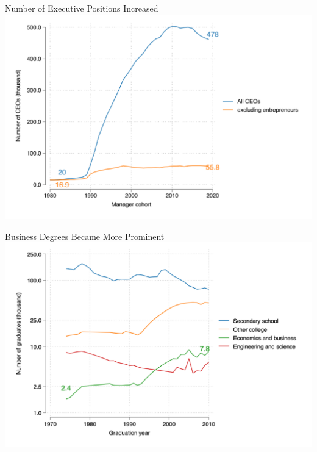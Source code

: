 \documentclass[
  ignorenonframetext,
  aspectratio=1610,
]{beamer}
\begin{document}
\begin{frame}{Number of Executive Positions Increased}
\protect\hypertarget{number-of-executive-positions-increased}{}
\includegraphics{fig/ceo-stock.png}
\end{frame}

\begin{frame}{Business Degrees Became More Prominent}
\protect\hypertarget{business-degrees-became-more-prominent}{}
\includegraphics{fig/school-graduates.png}
\end{frame}
\end{document}
